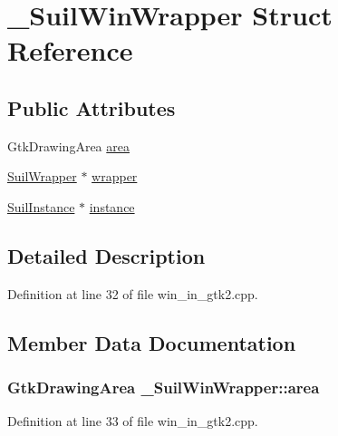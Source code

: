 \hypertarget{struct___suil_win_wrapper}{}\section{\+\_\+\+Suil\+Win\+Wrapper Struct Reference}
\label{struct___suil_win_wrapper}
\subsection*{Public Attributes}
\begin{DoxyCompactItemize}
\item 
Gtk\+Drawing\+Area \hyperlink{struct___suil_win_wrapper_a64d36509f11dbfe402c4116915c62098}{area}
\item 
\hyperlink{suil__internal_8h_ae19f6c4d775c4fc1141e4bfbfd8069cd}{Suil\+Wrapper} $\ast$ \hyperlink{struct___suil_win_wrapper_ad14391718a24958bf0cd6feb61fa0103}{wrapper}
\item 
\hyperlink{group__suil_ga767e978a8c5f7c0d5246da79c9b97c6b}{Suil\+Instance} $\ast$ \hyperlink{struct___suil_win_wrapper_a15b345aa959d37b583e44efe6f4daab5}{instance}
\end{DoxyCompactItemize}


\subsection{Detailed Description}


Definition at line 32 of file win\+\_\+in\+\_\+gtk2.\+cpp.



\subsection{Member Data Documentation}
\subsubsection[{\texorpdfstring{area}{area}}]{\setlength{\rightskip}{0pt plus 5cm}Gtk\+Drawing\+Area \+\_\+\+Suil\+Win\+Wrapper\+::area}\hypertarget{struct___suil_win_wrapper_a64d36509f11dbfe402c4116915c62098}{}\label{struct___suil_win_wrapper_a64d36509f11dbfe402c4116915c62098}


Definition at line 33 of file win\+\_\+in\+\_\+gtk2.\+cpp.

